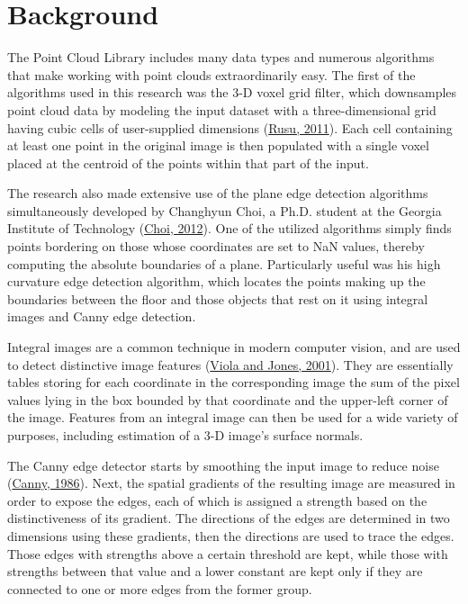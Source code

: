 \documentclass[12pt]{report}
\begin{document}
\section{Background}
The Point Cloud Library includes many data types and numerous algorithms that make working with point clouds extraordinarily easy.  The first of the algorithms used in this research was the 3-D voxel grid filter, which downsamples point cloud data by modeling the input dataset with a three-dimensional grid having cubic cells of user-supplied dimensions (\hyperref[bib:rusu]{Rusu, 2011}).  Each cell containing at least one point in the original image is then populated with a single voxel placed at the centroid of the points within that part of the input.

The research also made extensive use of the plane edge detection algorithms simultaneously developed by Changhyun Choi, a Ph.D. student at the Georgia Institute of Technology (\hyperref[bib:choi]{Choi, 2012}).  One of the utilized algorithms simply finds points bordering on those whose coordinates are set to NaN values, thereby computing the absolute boundaries of a plane.  Particularly useful was his high curvature edge detection algorithm, which locates the points making up the boundaries between the floor and those objects that rest on it using integral images and Canny edge detection.

Integral images are a common technique in modern computer vision, and are used to detect distinctive image features (\hyperref[bib:viola]{Viola and Jones, 2001}).  They are essentially tables storing for each coordinate in the corresponding image the sum of the pixel values lying in the box bounded by that coordinate and the upper-left corner of the image.  Features from an integral image can then be used for a wide variety of purposes, including estimation of a 3-D image's surface normals.

The Canny edge detector starts by smoothing the input image to reduce noise (\hyperref[bib:canny]{Canny, 1986}).  Next, the spatial gradients of the resulting image are measured in order to expose the edges, each of which is assigned a strength based on the distinctiveness of its gradient.  The directions of the edges are determined in two dimensions using these gradients, then the directions are used to trace the edges.  Those edges with strengths above a certain threshold are kept, while those with strengths between that value and a lower constant are kept only if they are connected to one or more edges from the former group.
\end{document}
